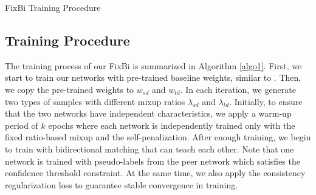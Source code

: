 \documentclass[final]{cvpr}
\begin{document}
\begin{algorithm}
\caption{FixBi Training Procedure}
\label{algo1}
\SetAlgoLined
{}
\end{algorithm}

\subsection{Training Procedure}
The training process of our FixBi is summarized in Algorithm \ref{algo1}. First, we start to train our networks with pre-trained baseline weights, similar to \cite{Gu2020}. Then, we copy the pre-trained weights to $w_{sd}$ and $w_{td}$. In each iteration, we generate two types of samples with different mixup ratios $\lambda_{sd}$ and $\lambda_{td}$. Initially, to ensure that the two networks have independent characteristics, we apply a warm-up period of $k$ epochs where each network is independently trained only with the fixed ratio-based mixup and the self-penalization. After enough training, we begin to train with bidirectional matching that can teach each other. Note that one network is trained with pseudo-labels from the peer network which satisfies the confidence threshold constraint. At the same time, we also apply the consistency regularization loss to guarantee stable convergence in training.
\end{document}
